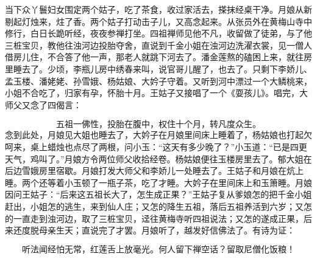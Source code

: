 当下众丫鬟妇女围定两个姑子，吃了茶食，收过家活去，搽抹经桌干净。月娘从新剔起灯烛来，炷了香。两个姑子打动击子儿，又高念起来。从张员外在黄梅山寺中修行，白日长跪听经，夜夜参禅打坐。四祖禅师见他不凡，收留做了徒弟，与了他三桩宝贝，教他往浊河边投胎夺舍，直说到千金小姐在浊河边洗濯衣裳，见一僧人借房儿住，不合答了他一声，那老人就跳下河去了。潘金莲熬的磕困上来，就往房里睡去了。少顷，李瓶儿房中绣春来叫，说官哥儿醒了，也去了。只剩下李娇儿、孟玉楼、潘姥姥、孙雪娥、杨姑娘、大妗子守着。又听到河中漂过一个大鳞桃来，小姐不合吃了，归家有孕，怀胎十月。王姑子又接唱了一个《耍孩儿》。唱完，大师父又念了四偈言：

\[
五祖一佛性，投胎在腹中，
权住十个月，转凡度众生。
\]
念到此处，月娘见大姐也睡去了，大妗子\textShouWai 在月娘里间床上睡着了，杨姑娘也打起欠呵来，桌上蜡烛也点尽了两根，问小玉：“这天有多少晚了？”小玉道：“已是四更天气，鸡叫了。”月娘方令两位师父收拾经卷。杨姑娘便往玉楼房里去了。郁大姐在后边雪娥房里宿歇。月娘打发大师父和李娇儿一处睡去了。王姑子和月娘在炕上睡。两个还等着小玉顿了一瓶子茶，吃了才睡。大妗子在里间床上和玉箫睡。月娘因问王姑子：“后来这五祖长大了，怎生成正果？”王姑子复从爹娘怎的把千金小姐赶出，小姐怎的逃生，来到仙人庄；又怎的降生五祖，落后五祖养活到六岁；又怎的一直走到浊河边，取了三桩宝贝，迳往黄梅寺听四祖说法；又怎的遂成正果，后来还度脱母亲生天；直说完了才罢。月娘听了，越发好信佛法了。有诗为证：

\[
听法闻经怕无常，红莲舌上放毫光。
何人留下禅空话？留取尼僧化饭粮！
\]
